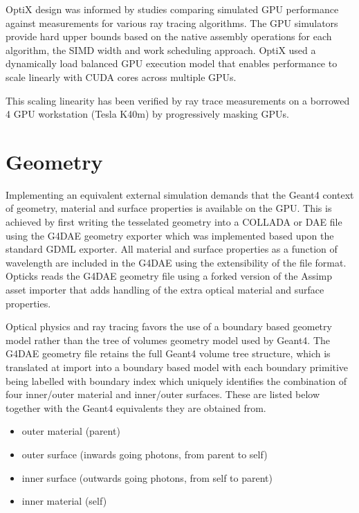 \documentclass[a4paper]{jpconf}
\begin{document}
OptiX design was informed by studies\cite{understanding} 
comparing simulated GPU performance against measurements
for various ray tracing algorithms. The GPU simulators 
provide hard upper bounds based on the native assembly operations
for each algorithm, the SIMD width and work scheduling approach. 
OptiX used a dynamically load balanced GPU execution model that enables
performance to scale linearly with CUDA cores across multiple GPUs. 

This scaling linearity has been verified by ray trace measurements on a 
borrowed 4 GPU workstation (Tesla K40m) by progressively masking GPUs.



\section{Geometry}

Implementing an equivalent external simulation demands that the Geant4 
context of geometry, material and surface properties is available on the GPU.
This is achieved by first writing the tesselated geometry into a COLLADA\cite{colladaURL} or DAE file  
using the G4DAE\cite{g4daeURL} geometry exporter which was implemented based upon the 
standard GDML exporter. All material and surface properties as a function of wavelength are 
included in the G4DAE using the extensibility of the file format.
Opticks reads the G4DAE geometry file using a forked version\cite{AssimpFork} of the
Assimp\cite{Assimp} asset importer that adds handling of the extra optical material and surface
properties. 

Optical physics and ray tracing favors the use of a boundary based geometry model 
rather than the tree of volumes geometry model used by Geant4. 
The G4DAE geometry file retains the full Geant4 volume tree structure, which is translated 
at import into a boundary based model with each boundary primitive being 
labelled with boundary index which uniquely identifies the combination of four inner/outer material and inner/outer surfaces. 
These are listed below together with the Geant4 equivalents they are obtained from.
\begin{itemize}
\item outer material (parent)
\item outer surface (inwards going photons, from parent to self)
\item inner surface (outwards going photons, from self to parent)
\item inner material (self)
\end{itemize}
\end{document}
